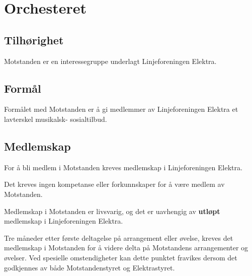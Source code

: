 \section{Orchesteret}
\subsection{Tilhørighet}
    \begin{statute}
        Motstanden er en interessegruppe underlagt Linjeforeningen Elektra.
    \end{statute}

\subsection{Formål}
    \begin{statute}
        Formålet med Motstanden er å gi medlemmer av Linjeforeningen Elektra et lavterskel musikalsk- sosialtilbud.
    \end{statute}

\subsection{Medlemskap}\label{medlemskap}
    \begin{statute}
        For å bli medlem i Motstanden kreves medlemskap i Linjeforeningen Elektra.
    \end{statute}
    \begin{statute}
        Det kreves ingen kompetanse eller forkunnskaper for å være medlem av Motstanden.
    \end{statute}
    \begin{statute}
        Medlemskap i Motstanden er livsvarig, og det er uavhengig av \textbf{utløpt} medlemskap i Linjeforeningen Elektra.            
    \end{statute}
    \begin{statute}
        Tre måneder etter første deltagelse på arrangement eller øvelse, kreves det medlemskap i 
        Motstanden for å videre delta på Motstandens arrangementer og øvelser. Ved spesielle omstendigheter kan dette punktet fravikes dersom det godkjennes av både Motstandenstyret og Elektrastyret. 
    \end{statute}

